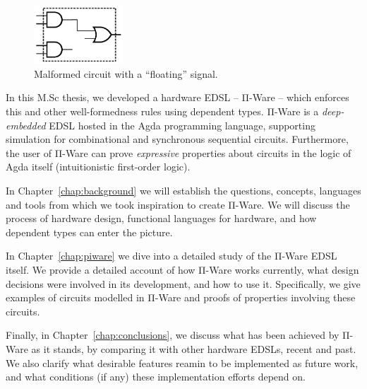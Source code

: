     \begin{figure}[h]
        \centerline{\includegraphics[width=0.3\textwidth]{imgs/floating-wire.pdf}}
        \caption{Malformed circuit with a ``floating'' signal. \label{fig:floating-wire}}
    \end{figure}

    In this M.Sc thesis, we developed a hardware \ac{EDSL} -- Π-Ware -- which enforces this and other
    well-formedness rules using dependent types.
    Π-Ware is a \emph{deep-embedded} \ac{EDSL} hosted in the Agda programming language,
    supporting simulation for combinational and synchronous sequential circuits.
    Furthermore, the user of Π-Ware can prove \emph{expressive} properties about circuits in the logic
    of Agda itself (intuitionistic first-order logic).

    In Chapter~\ref{chap:background} we will establish the questions, concepts, languages and tools
    from which we took inspiration to create Π-Ware.
    We will discuss the process of hardware design, functional languages for hardware,
    and how dependent types can enter the picture.

    In Chapter~\ref{chap:piware} we dive into a detailed study of the Π-Ware \ac{EDSL} itself.
    We provide a detailed account of how Π-Ware works currently,
    what design decisions were involved in its development, and how to use it.
    Specifically, we give examples of circuits modelled in Π-Ware and proofs of properties involving
    these circuits.

    Finally, in Chapter~\ref{chap:conclusions}, we discuss what has been achieved by Π-Ware as it stands,
    by comparing it with other hardware \acp{EDSL}, recent and past.
    We also clarify what desirable features reamin to be implemented as future work,
    and what conditions (if any) these implementation efforts depend on.

